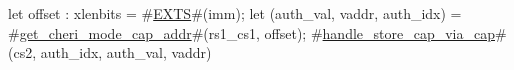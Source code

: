 let offset : xlenbits = #\hyperref[sailRISCVzEXTS]{EXTS}#(imm);
let (auth_val, vaddr, auth_idx) = #\hyperref[sailRISCVzgetzycherizymodezycapzyaddr]{get\_cheri\_mode\_cap\_addr}#(rs1_cs1, offset);
#\hyperref[sailRISCVzhandlezystorezycapzyviazycap]{handle\_store\_cap\_via\_cap}#(cs2, auth_idx, auth_val, vaddr)
